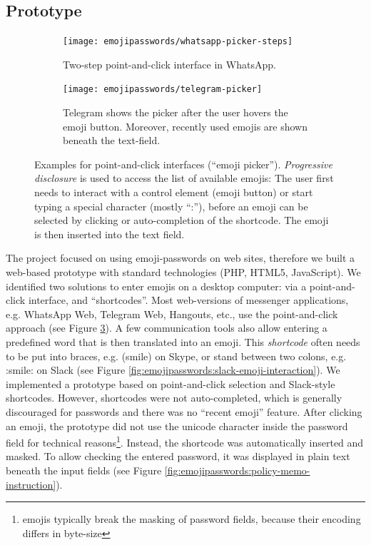 \subsection{Prototype}
\begin{figure}
	\centering
	\begin{subfigure}[t]{0.45\textwidth}
		\texttt{[image: emojipasswords/whatsapp-picker-steps]}
		\caption{\label{fig:emojipasswords:whatsapp-point-and-click}Two-step point-and-click interface  in WhatsApp.}
	\end{subfigure}
	\hspace*{0.1cm}
	\begin{subfigure}[t]{0.45\textwidth}
		\texttt{[image: emojipasswords/telegram-picker]}
		\caption{\label{fig:emojipasswords:telegram-point-and-click} Telegram shows the picker after the user hovers  the emoji button. Moreover, recently used emojis are shown beneath the text-field.}
	\end{subfigure}
	
	\caption{\label{fig:emojipasswords:real-world-pickers}
		Examples for point-and-click interfaces (``emoji picker''). \textit{Progressive disclosure} is used to access
		the list of available emojis: The user first needs to interact with a control element (emoji button) or start typing a special character (mostly ``:''), before an emoji can be selected by clicking or auto-completion of the shortcode. The emoji is then inserted into the text field.
	} 
\end{figure}
The project focused on using emoji-passwords on web sites, therefore we built a web-based prototype with standard technologies (PHP, HTML5, JavaScript). We identified two solutions to enter emojis on a desktop computer: via a point-and-click interface, and ``shortcodes''. Most web-versions of messenger applications, e.g. WhatsApp Web, Telegram Web, Hangouts, etc., use the point-and-click approach (see Figure \ref{fig:emojipasswords:real-world-pickers}). A few communication tools also allow entering a predefined word that is then translated into an emoji. This \textit{shortcode} often needs to be put into braces, e.g. (smile) on Skype, or stand between two colons, e.g. :smile: on Slack (see Figure \ref{fig:emojipasswords:slack-emoji-interaction}). We implemented a prototype based on point-and-click selection and Slack-style shortcodes. However, shortcodes were not auto-completed, which is generally discouraged for passwords \cite{Melicher2016UsabilityMobileTextPasswords} and there was no ``recent emoji'' feature. 
After clicking an emoji, the prototype did not use the unicode character inside the password field for technical reasons\footnote{emojis typically break the masking of password fields, because their encoding differs in byte-size}. Instead, the shortcode was automatically inserted and masked. To allow checking the entered password, it was displayed in plain text beneath the input fields (see Figure \ref{fig:emojipasswords:policy-memo-instruction}). 

